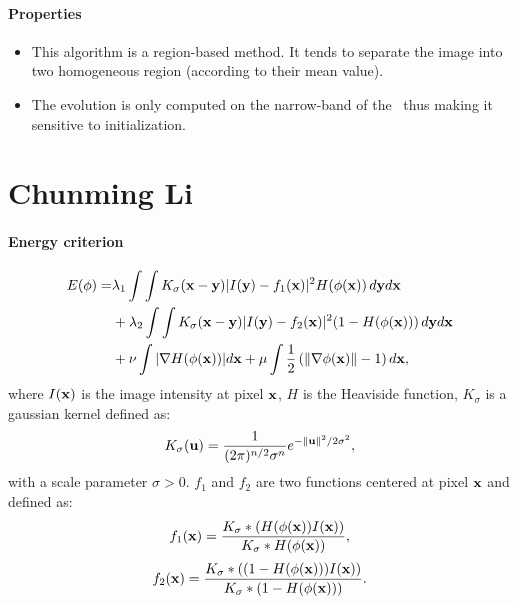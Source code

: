 \paragraph{Properties}

\begin{itemize}
	\item This algorithm is a region-based method. It tends to separate the image into two homogeneous region (according to their mean value).
	\item The evolution is only computed on the narrow-band of the \ls~thus making it sensitive to initialization.
\end{itemize}


\newpage
\section[Chunming Li]{Chunming Li \cite{Li2008}}
\label{sec:Li}

\paragraph{Energy criterion}
\begin{eqnarray}
	\label{eq:NRJ_li}
	\nonumber E(\phi) = & \lambda_1 \int \int K_\sigma(\mathbf{x} - \mathbf{y}) | I(\mathbf{y}) - f_1(\mathbf{x}) |^2 H(\phi(\mathbf{x})) \, d\mathbf{y}d\mathbf{x} \\
	& + \lambda_2 \int \int K_\sigma(\mathbf{x} - \mathbf{y}) | I(\mathbf{y}) - f_2(\mathbf{x}) |^2 (1 - H(\phi(\mathbf{x})))\, d\mathbf{y}d\mathbf{x} \\ 
	\nonumber & + \nu \int| \nabla H(\phi(\mathbf{x})) |d\mathbf{x} + \mu \int \frac{1}{2}\left(\|\nabla \phi(\mathbf{x}) \| - 1\right)d\mathbf{x},
\end{eqnarray}
where $I(\mathbf{x})$ is the image intensity at pixel $\mathbf{x}$, $H$ is the Heaviside function, $K_\sigma$ is a gaussian kernel defined as:
\begin{equation}
	\label{eq:Ksigma_li}
	K_\sigma(\mathbf{u}) = \frac{1}{(2\pi)^{n/2}\sigma^n}e^{-\|\mathbf{u}\|^2/2\sigma^2},
\end{equation}
with a scale parameter $\sigma > 0$. $f_1$ and $f_2$ are two functions centered at pixel $\mathbf{x}$ and defined as:
\begin{equation}
	\label{eq:f1_li}
	f_1(\mathbf{x}) = \frac{K_\sigma \ast (H(\phi(\mathbf{x}))I(\mathbf{x}))}{K_\sigma \ast H(\phi(\mathbf{x}))},
\end{equation}
\begin{equation}
	\label{eq:f2_li}
	f_2(\mathbf{x}) = \frac{K_\sigma \ast ((1 - H(\phi(\mathbf{x})))I(\mathbf{x}))}{K_\sigma \ast (1- H(\phi(\mathbf{x})))}.
\end{equation}

